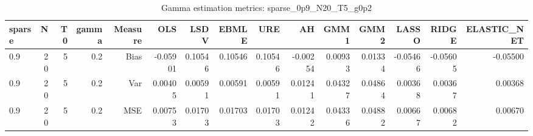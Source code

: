 \begin{table}[!htbp]\centering
\caption{Gamma estimation metrics: sparse_0p9_N20_T5_g0p2}
\label{tab:table1_sparse_0p9_N20_T5_g0p2}
\begin{tabular}{lrrrrrrrrrrrrrr}
\hline
sparse & N & T0 & gamma & Measure & OLS & LSDV & EBMLE & URE & AH & GMM1 & GMM2 & LASSO & RIDGE & ELASTIC_NET \\
\hline
0.9 & 20 & 5 & 0.2 & Bias & -0.05901 & 0.10546 & 0.10546 & 0.10546 & -0.00254 & 0.00933 & 0.01334 & -0.05466 & -0.05605 & -0.05500 \\
0.9 & 20 & 5 & 0.2 & Var & 0.00405 & 0.00591 & 0.00591 & 0.00591 & 0.01241 & 0.04327 & 0.04864 & 0.00368 & 0.00367 & 0.00368 \\
0.9 & 20 & 5 & 0.2 & MSE & 0.00753 & 0.01703 & 0.01703 & 0.01703 & 0.01242 & 0.04336 & 0.04882 & 0.00667 & 0.00682 & 0.00670 \\
\hline
\end{tabular}
\end{table}

